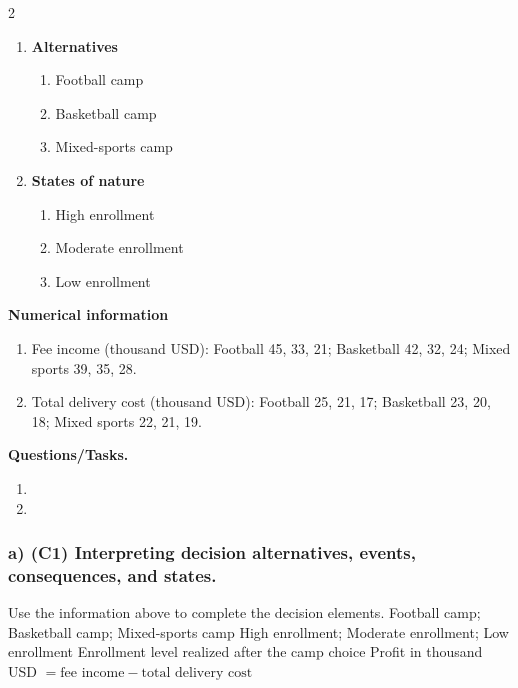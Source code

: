 \begin{multicols}{2}
\begin{enumerate}[label=\arabic*.]
 \item \textbf{Alternatives}
 \begin{enumerate}[label=\roman*)]
  \item Football camp
  \item Basketball camp
  \item Mixed-sports camp
 \end{enumerate}
 \item \textbf{States of nature}
 \begin{enumerate}[label=\roman*)]
  \item High enrollment
  \item Moderate enrollment
  \item Low enrollment
 \end{enumerate}
\end{enumerate}
\end{multicols}
 \textbf{Numerical information}
 \begin{enumerate}[label=\roman*)]
  \item Fee income (thousand USD): Football 45, 33, 21; Basketball 42, 32, 24; Mixed sports 39, 35, 28.
  \item Total delivery cost (thousand USD): Football 25, 21, 17; Basketball 23, 20, 18; Mixed sports 22, 21, 19.
 \end{enumerate}


\textbf{Questions/Tasks.}
\begin{enumerate}[label=\textbf{\alph*)}]
 \item {}
 \item {}
\end{enumerate}
\subsubsection*{a) \textbf{(C1)} Interpreting decision alternatives, events, consequences, and states.}
\label{subsec:problem2-youth-sports-camp-c1}
Use the information above to complete the decision elements.
\DecisionElementsTable
{Football camp; Basketball camp; Mixed-sports camp}
{High enrollment; Moderate enrollment; Low enrollment}
{Enrollment level realized after the camp choice}
{Profit in thousand USD $= \text{fee income} - \text{total delivery cost}$}
